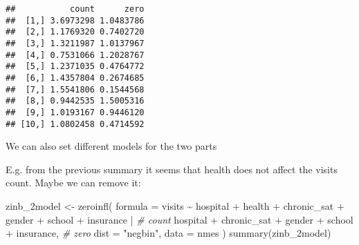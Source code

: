 \documentclass[
  oneside]{book}
\newenvironment{Shaded}{\begin{snugshade}}{\end{snugshade}}
\newcommand{\AttributeTok}[1]{\textcolor[rgb]{0.77,0.63,0.00}{#1}}
\newcommand{\CommentTok}[1]{\textcolor[rgb]{0.56,0.35,0.01}{\textit{#1}}}
\newcommand{\FunctionTok}[1]{\textcolor[rgb]{0.00,0.00,0.00}{#1}}
\newcommand{\NormalTok}[1]{#1}
\newcommand{\OtherTok}[1]{\textcolor[rgb]{0.56,0.35,0.01}{#1}}
\newcommand{\SpecialCharTok}[1]{\textcolor[rgb]{0.00,0.00,0.00}{#1}}
\newcommand{\StringTok}[1]{\textcolor[rgb]{0.31,0.60,0.02}{#1}}
\begin{document}
\begin{verbatim}
##           count      zero
##  [1,] 3.6973298 1.0483786
##  [2,] 1.1769320 0.7402720
##  [3,] 1.3211987 1.0137967
##  [4,] 0.7531066 1.2028767
##  [5,] 1.2371035 0.4764772
##  [6,] 1.4357804 0.2674685
##  [7,] 1.5541806 0.1544568
##  [8,] 0.9442535 1.5005316
##  [9,] 1.0193167 0.9446120
## [10,] 1.0802458 0.4714592
\end{verbatim}

We can also set different models for the two parts

E.g. from the previous summary it seems that health does not affect the visits count.
Maybe we can remove it:

\begin{Shaded}
\begin{Highlighting}[]
\NormalTok{zinb\_2model }\OtherTok{\textless{}{-}} \FunctionTok{zeroinfl}\NormalTok{(}
  \AttributeTok{formula =}\NormalTok{ visits }\SpecialCharTok{\textasciitilde{}}
\NormalTok{    hospital }\SpecialCharTok{+}\NormalTok{ health }\SpecialCharTok{+}\NormalTok{ chronic\_sat }\SpecialCharTok{+}\NormalTok{ gender }\SpecialCharTok{+}\NormalTok{ school }\SpecialCharTok{+}\NormalTok{ insurance }\SpecialCharTok{|} \CommentTok{\# count}
\NormalTok{      hospital }\SpecialCharTok{+}\NormalTok{ chronic\_sat }\SpecialCharTok{+}\NormalTok{ gender }\SpecialCharTok{+}\NormalTok{ school }\SpecialCharTok{+}\NormalTok{ insurance, }\CommentTok{\# zero}
  \AttributeTok{dist =} \StringTok{"negbin"}\NormalTok{,}
  \AttributeTok{data =}\NormalTok{ nmes}
\NormalTok{)}
\FunctionTok{summary}\NormalTok{(zinb\_2model)}
\end{Highlighting}
\end{Shaded}
\end{document}
